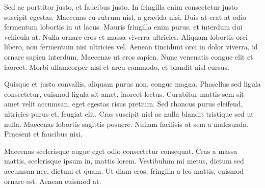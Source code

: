 \documentclass[openright]{book} %
\begin{document}
Sed ac porttitor justo, et faucibus justo. In fringilla enim consectetur justo suscipit egestas. Maecenas eu rutrum nisl, a gravida nisi. Duis at erat at odio fermentum lobortis in ut lacus. Mauris fringilla enim purus, et interdum dui vehicula at. Nulla ornare eros et massa viverra ultricies. Aliquam lobortis orci libero, non fermentum nisi ultricies vel. Aenean tincidunt orci in dolor viverra, id ornare sapien interdum. Maecenas ut eros sapien. Nunc venenatis congue elit et laoreet. Morbi ullamcorper nisl et arcu commodo, et blandit nisl cursus.

Quisque et justo convallis, aliquam purus non, congue magna. Phasellus sed ligula consectetur, euismod ligula sit amet, laoreet lectus. Curabitur mattis sem sit amet velit accumsan, eget egestas risus pretium. Sed rhoncus purus eleifend, ultricies purus et, feugiat elit. Cras suscipit nisl ac nulla blandit tristique sed ut nulla. Maecenas lobortis sagittis posuere. Nullam facilisis at sem a malesuada. Praesent et faucibus nisi.

Maecenas scelerisque augue eget odio consectetur consequat. Cras a massa mattis, scelerisque ipsum in, mattis lorem. Vestibulum mi metus, dictum sed accumsan nec, dictum et quam. Ut diam eros, fringilla a leo mattis, euismod ornare est. Aenean euismod at. 
\end{document}
